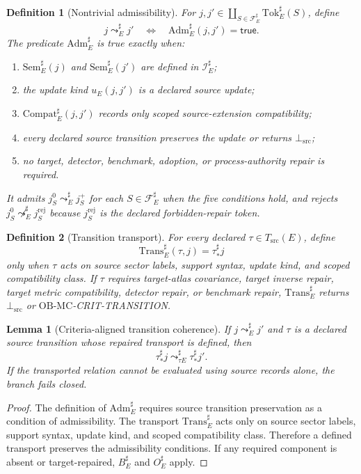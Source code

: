 \documentclass[11pt]{article}
\newcommand{\BottomSrc}{\bot_{\mathrm{src}}}
\newcommand{\Tok}{\mathrm{Tok}}
\newcommand{\Sem}{\mathrm{Sem}}
\newcommand{\Adm}{\mathrm{Adm}}
\newcommand{\Trans}{\mathrm{Trans}}
\newcommand{\Compat}{\mathrm{Compat}}
\newcommand{\OBMC}{\mathrm{OB}\mbox{-}\mathrm{MC}}
\newcommand{\Fsrc}{\mathcal{F}_{E}^{\sharp}}
\newtheorem{definition}{Definition}
\newtheorem{lemma}{Lemma}
\begin{document}
\begin{definition}[Nontrivial admissibility]
For \(j,j'\in\coprod_{S\in\Fsrc}\Tok_E^{\sharp}(S)\), define
\[
  j\leadsto_E^{\sharp} j'
  \quad\Longleftrightarrow\quad
  \Adm_E^{\sharp}(j,j')=\mathsf{true}.
\]
The predicate \(\Adm_E^{\sharp}\) is true exactly when:
\begin{enumerate}[leftmargin=*]
  \item \(\Sem_E^{\sharp}(j)\) and \(\Sem_E^{\sharp}(j')\) are defined in
  \(\mathcal{I}_E^{\sharp}\);
  \item the update kind \(u_E(j,j')\) is a declared source update;
  \item \(\Compat_E^{\sharp}(j,j')\) records only scoped source-extension
  compatibility;
  \item every declared source transition preserves the update or returns
  \(\BottomSrc\);
  \item no target, detector, benchmark, adoption, or process-authority repair
  is required.
\end{enumerate}
It admits \(j_S^{0}\leadsto_E^{\sharp}j_S^{+}\) for each \(S\in\Fsrc\) when
the five conditions hold, and rejects
\(j_S^{0}\not\leadsto_E^{\sharp}j_S^{\mathrm{rej}}\) because
\(j_S^{\mathrm{rej}}\) is the declared forbidden-repair token.
\end{definition}

\begin{definition}[Transition transport]
For every declared \(\tau\in T_{\mathrm{src}}(E)\), define
\[
  \Trans_E^{\sharp}(\tau,j)=\tau_{\ast}^{\sharp}j
\]
only when \(\tau\) acts on source sector labels, support syntax, update kind,
and scoped compatibility class. If \(\tau\) requires target-atlas covariance,
target inverse repair, target metric compatibility, detector repair, or
benchmark repair, \(\Trans_E^{\sharp}\) returns \(\BottomSrc\) or
\(\OBMC\)-CRIT-TRANSITION.
\end{definition}

\begin{lemma}[Criteria-aligned transition coherence]
If \(j\leadsto_E^{\sharp} j'\) and \(\tau\) is a declared source transition
whose repaired transport is defined, then
\[
  \tau_{\ast}^{\sharp}j
  \leadsto_{\tau E}^{\sharp}
  \tau_{\ast}^{\sharp}j'.
\]
If the transported relation cannot be evaluated using source records alone,
the branch fails closed.
\end{lemma}

\begin{proof}
The definition of \(\Adm_E^{\sharp}\) requires source transition preservation
as a condition of admissibility. The transport \(\Trans_E^{\sharp}\) acts only
on source sector labels, support syntax, update kind, and scoped compatibility
class. Therefore a defined transport preserves the admissibility conditions.
If any required component is absent or target-repaired, \(B_E^{\sharp}\) and
\(O_E^{\sharp}\) apply.
\end{proof}
\end{document}
